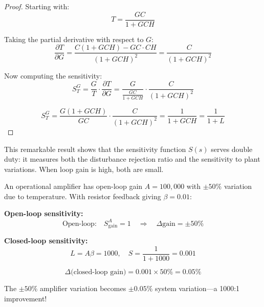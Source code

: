 \begin{proof}
Starting with:
\begin{equation}
T = \frac{GC}{1 + GCH}
\end{equation}

Taking the partial derivative with respect to $G$:
\begin{equation}
\frac{\partial T}{\partial G} = \frac{C(1 + GCH) - GC \cdot CH}{(1 + GCH)^2} = \frac{C}{(1 + GCH)^2}
\end{equation}

Now computing the sensitivity:
\begin{equation}
S^G_T = \frac{G}{T} \cdot \frac{\partial T}{\partial G} = \frac{G}{\frac{GC}{1+GCH}} \cdot \frac{C}{(1+GCH)^2}
\end{equation}

\begin{equation}
S^G_T = \frac{G(1+GCH)}{GC} \cdot \frac{C}{(1+GCH)^2} = \frac{1}{1+GCH} = \frac{1}{1+L}
\end{equation}
\end{proof}

This remarkable result shows that the sensitivity function $S(s)$ serves double duty: it measures both the disturbance rejection ratio and the sensitivity to plant variations. When loop gain is high, both are small.

\begin{example}
An operational amplifier has open-loop gain $A = 100{,}000$ with $\pm 50\%$ variation due to temperature. With resistor feedback giving $\beta = 0.01$:

\textbf{Open-loop sensitivity:}
\begin{equation}
\text{Open-loop:} \quad S^A_{\text{gain}} = 1 \quad \Rightarrow \quad \Delta\text{gain} = \pm 50\%
\end{equation}

\textbf{Closed-loop sensitivity:}
\begin{equation}
L = A\beta = 1000, \quad S = \frac{1}{1+1000} = 0.001
\end{equation}

\begin{equation}
\Delta\text{(closed-loop gain)} = 0.001 \times 50\% = 0.05\%
\end{equation}

The $\pm 50\%$ amplifier variation becomes $\pm 0.05\%$ system variation---a 1000:1 improvement!
\end{example}

